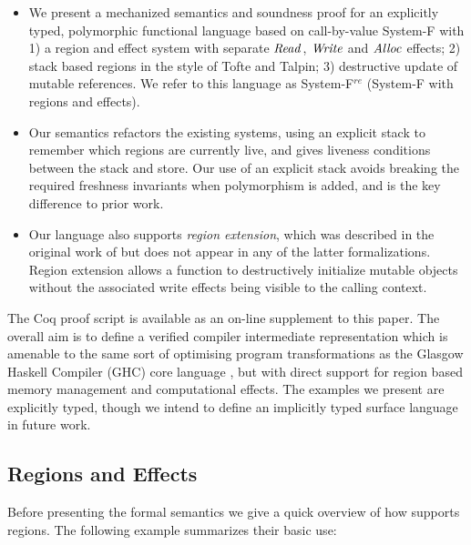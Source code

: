 \begin{itemize}
\item   We present a mechanized semantics and soundness proof for an explicitly typed, polymorphic functional language based on call-by-value System-F with 1) a region and effect system with separate $\mathit{Read}$, $\mathit{Write}$ and $\mathit{Alloc}$ effects; 2) stack based regions in the style of Tofte and Talpin; 3) destructive update of mutable references. We refer to this language as System-F$^{re}$ (System-F with regions and effects).

\item   Our semantics refactors the existing systems, using an explicit stack to remember which regions are currently live, and gives liveness conditions between the stack and store. Our use of an explicit stack avoids breaking the required freshness invariants when polymorphism is added, and is the key difference to prior work.

\item   Our language also supports \emph{region extension}, which was described in the original work of \cite{Lucassen:types-and-effects} but does not appear in any of the latter formalizations. Region extension allows a function to destructively initialize mutable objects without the associated write effects being visible to the calling context. 
\end{itemize}

The Coq proof script is available as an on-line supplement to this paper. The overall aim is to define a verified compiler intermediate representation which is amenable to the same sort of optimising program transformations as the Glasgow Haskell Compiler (GHC) core language \cite{PeytonJones:transformation}, but with direct support for region based memory management and computational effects. The examples we present are explicitly typed, though we intend to define an implicitly typed surface language in future work.


\subsection{Regions and Effects}
\label{s:Tutorial}

Before presenting the formal semantics we give a quick overview of how \SystemFre supports regions. The following example summarizes their basic use:

